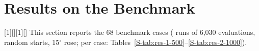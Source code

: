 \section{Results on the Benchmark}
\label{sec:results}
\makeatletter
\begingroup
{}[1][]{\supp@store}[1][]{\supp@store}%
%
%
\endgroup
\newcommand{\swResFigure}[1]{\@ifundefined{supp@body@#1}{\par\noindent\TBD{generated figure \detokenize{#1} not found}\par}{%
  \@ifundefined{supp@used@#1}{\global\@namedef{supp@used@#1}{}%
    \begin{figure}[!t]\@nameuse{supp@body@#1}\end{figure}}{}}}
\protected\def\swResRef#1{\@ifundefined{swres@alias@#1}%
  {\@ifundefined{r@#1}{\swres@origref{S-#1}}{\swres@origref{#1}}}%
  {\swres@origref{\@nameuse{swres@alias@#1}}}}
\let\swres@origref\ref
\newcommand{\swResRefs}{\let\ref\swResRef}
\newcommand{\swResNarrowGraphics}{\let\swres@ig\includegraphics
  \renewcommand{\includegraphics}[2][]{\swres@ig[width=0.8\textwidth]{##2}}}
\newcommand{\swResWrapNotes}{\let\swres@mc\multicolumn
  \def\multicolumn##1##2##3{\swres@mc{##1}{p{0.9\textwidth}}{##3}}}
\newcommand{\swResCaptureFigs}[1]{\begingroup\RenewEnviron{figure}[1][]{\supp@store}\RenewEnviron{figure*}[1][]{\supp@store}%
  \CaptureSuppTables{#1}\endgroup}
\makeatother
This section reports the 68 benchmark cases (\NRunsBenchmark{} runs of 6,030 evaluations, random starts, 15$^\circ$ rose; per case: Tables~\ref{S-tab:res-1-500}--\ref{S-tab:res-2-1000}).

